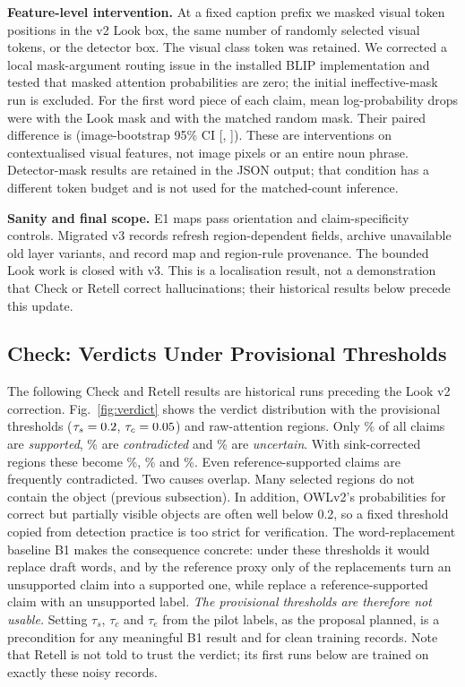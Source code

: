 \textbf{Feature-level intervention.} At a fixed caption prefix we masked visual token positions in the v2 Look box, the same number of randomly selected visual tokens, or the detector box. The visual class token was retained. We corrected a local mask-argument routing issue in the installed BLIP implementation and tested that masked attention probabilities are zero; the initial ineffective-mask run is excluded. For the first word piece of each claim, mean log-probability drops were \LookFeatureDrop{} with the Look mask and \LookRandomDrop{} with the matched random mask. Their paired difference is \LookFeatureGain{} (image-bootstrap 95\% CI [\LookFeatureLow, \LookFeatureHigh]). These are interventions on contextualised visual features, not image pixels or an entire noun phrase. Detector-mask results are retained in the JSON output; that condition has a different token budget and is not used for the matched-count inference.

\textbf{Sanity and final scope.} E1 maps pass orientation and claim-specificity controls. Migrated v3 records refresh region-dependent fields, archive unavailable old layer variants, and record map and region-rule provenance. The bounded Look work is closed with v3. This is a localisation result, not a demonstration that Check or Retell correct hallucinations; their historical results below precede this update.

\subsection{Check: Verdicts Under Provisional Thresholds}
The following Check and Retell results are historical runs preceding the Look v2 correction. Fig.~\ref{fig:verdict} shows the verdict distribution with the provisional thresholds ($\tau_s=0.2$, $\tau_c=0.05$) and raw-attention regions. Only \VerdictSupportedPct\% of all claims are \emph{supported}, \VerdictContradictedPct\% are \emph{contradicted} and \VerdictUncertainPct\% are \emph{uncertain}. With sink-corrected regions these become \SinkVerdictSupportedPct\%, \SinkVerdictContradictedPct\% and \SinkVerdictUncertainPct\%. Even reference-supported claims are frequently contradicted. Two causes overlap. Many selected regions do not contain the object (previous subsection). In addition, OWLv2's probabilities for correct but partially visible objects are often well below 0.2, so a fixed threshold copied from detection practice is too strict for verification. The word-replacement baseline B1 makes the consequence concrete: under these thresholds it would replace \BOneN{} draft words, and by the reference proxy only \BOneFix{} of the replacements turn an unsupported claim into a supported one, while \BOneBreak{} replace a reference-supported claim with an unsupported label. \emph{The provisional thresholds are therefore not usable.} Setting $\tau_s$, $\tau_c$ and $\tau_e$ from the pilot labels, as the proposal planned, is a precondition for any meaningful B1 result and for clean training records. Note that Retell is not told to trust the verdict; its first runs below are trained on exactly these noisy records.

